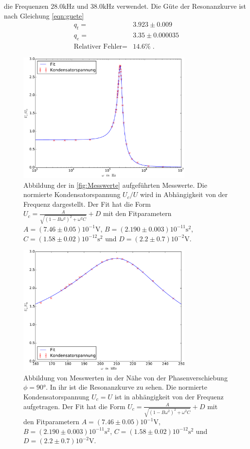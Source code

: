 die Frequenzen $28.0\si{\kilo\hertz}$ und $38.0\si{\kilo\hertz}$ verwendet.
Die Güte der Resonanzkurve ist nach Gleichung \eqref{eqn:guete}
\begin{align*}
  q_t=&3.923\pm0.009\\
  q_e=&3.35\pm0.000035\\
  \text{Relativer Fehler}=&14.6\%\;.
\end{align*}
\begin{figure}
  \centering
  \includegraphics[width=0.78\textwidth]{Kondensatorspannung.pdf}
  \caption{Abbildung der in \ref{fig:Messwerte} aufgeführten Messwerte.
  Die normierte Kondensatorspannung $U_c/U$ wird in Abhängigkeit von der
  Frequenz dargestellt. Der Fit hat die Form
    $U_c=\frac{A}{\sqrt{(1-B\omega^2)^2+\omega^2 C}}+D$
    mit den Fitparametern
    $A=(7.46\pm0.05)10^{-1}\si{\volt}$, $B=(2.190\pm0.003)10^{-11}\si{\second}^2$,
    $C=(1.58\pm0.02)10^{-12}\si{\second}^2$ und $D=(2.2\pm0.7)10^{-2}\si{\volt}$\;.}
  \label{fig:Kondensatorspannung}
\end{figure}
\begin{figure}
  \centering
  \includegraphics[width=0.78\textwidth]{Resonanzkurve.pdf}
  \caption{Abbildung von Messwerten in der Nähe von der Phasenverschiebung $\phi=90°$.
  In ihr ist die Resonanzkurve zu sehen. Die normierte Kondensatorspannung $U_c=U$
  ist in abhängigkeit von der Frequenz aufgetragen. Der Fit hat die Form
    $U_c=\frac{A}{\sqrt{(1-B\omega^2)^2+\omega^2 C}}+D$
    mit den Fitparametern
    $A=(7.46\pm0.05)10^{-1}\si{\volt}$, $B=(2.190\pm0.003)10^{-11}\si{\second}^2$,
    $C=(1.58\pm0.02)10^{-12}\si{\second}^2$ und $D=(2.2\pm0.7)10^{-2}\si{\volt}$\;.}
  \label{fig:Resonanzkurve}
\end{figure}
